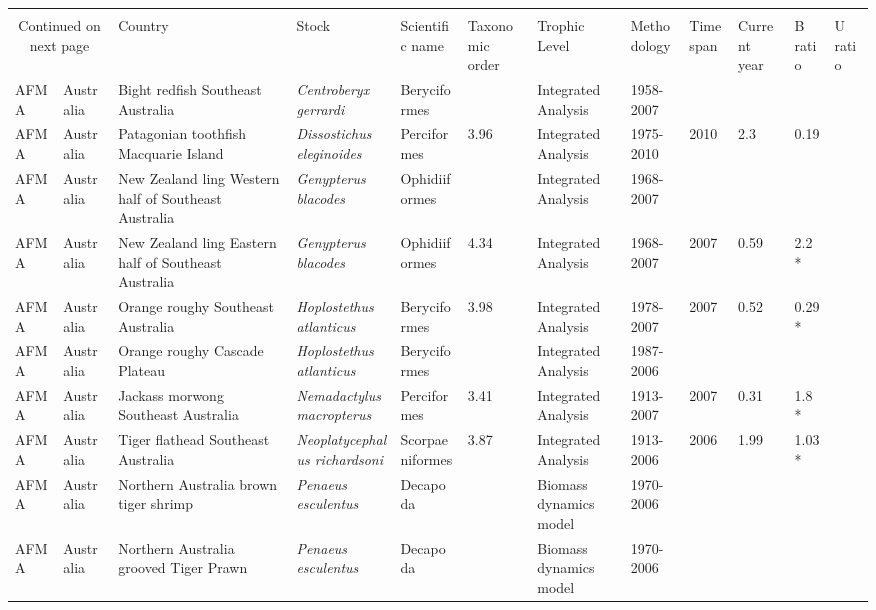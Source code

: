 \begin{longtable}{p{1.5cm}p{1.5cm}p{3cm}p{3cm}p{2.5cm}p{0.9cm}p{1.4cm}p{0.9cm}p{0.9cm}p{0.9cm}p{1cm}}
  \bottomrule \\ \multicolumn{2}{c}{Continued on next page} \endfoot \endlastfoot
Management & Country & Stock & Scientific name & Taxonomic order & Trophic Level & Methodology & Timespan & Current year & B ratio & U ratio  \\ \midrule \endhead
AFMA & Australia & Bight redfish Southeast Australia & \textit{Centroberyx gerrardi} & Beryciformes &  & Integrated Analysis & 1958-2007 &  &  &  \\ 
  AFMA & Australia & Patagonian toothfish Macquarie Island & \textit{Dissostichus eleginoides} & Perciformes & 3.96 & Integrated Analysis & 1975-2010 & 2010 & 2.3 & 0.19 \\ 
  AFMA & Australia & New Zealand ling Western half of Southeast Australia & \textit{Genypterus blacodes} & Ophidiiformes &  & Integrated Analysis & 1968-2007 &  &  &  \\ 
  AFMA & Australia & New Zealand ling Eastern half of Southeast Australia & \textit{Genypterus blacodes} & Ophidiiformes & 4.34 & Integrated Analysis & 1968-2007 & 2007 & 0.59 & 2.2 * \\ 
  AFMA & Australia & Orange roughy Southeast Australia & \textit{Hoplostethus atlanticus} & Beryciformes & 3.98 & Integrated Analysis & 1978-2007 & 2007 & 0.52 & 0.29 * \\ 
  AFMA & Australia & Orange roughy Cascade Plateau & \textit{Hoplostethus atlanticus} & Beryciformes &  & Integrated Analysis & 1987-2006 &  &  &  \\ 
  AFMA & Australia & Jackass morwong Southeast Australia & \textit{Nemadactylus macropterus} & Perciformes & 3.41 & Integrated Analysis & 1913-2007 & 2007 & 0.31 & 1.8 * \\ 
  AFMA & Australia & Tiger flathead Southeast Australia & \textit{Neoplatycephalus richardsoni} & Scorpaeniformes & 3.87 & Integrated Analysis & 1913-2006 & 2006 & 1.99 & 1.03 * \\ 
  AFMA & Australia & Northern Australia brown tiger shrimp & \textit{Penaeus esculentus} & Decapoda &  & Biomass dynamics model & 1970-2006 &  &  &  \\ 
  AFMA & Australia & Northern Australia grooved Tiger Prawn & \textit{Penaeus esculentus} & Decapoda &  & Biomass dynamics model & 1970-2006 &  &  &  \\ 

\end{longtable}
